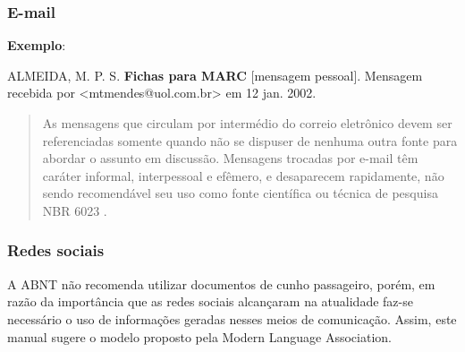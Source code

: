 \subsubsection{E-mail}

\begin{flushleft}
\begin{singlespace}
\end{singlespace}
\end{flushleft}

\begin{exemplomanual}
\textbf{Exemplo}:\\
\begin{singlespace}
ALMEIDA, M. P. S. \textbf{Fichas para MARC} [mensagem pessoal]. Mensagem recebida por <mtmendes@uol.com.br> em 12 jan. 2002.
\end{singlespace}
\end{exemplomanual}

\begin{quote}
As mensagens que circulam por intermédio do correio eletrônico devem ser referenciadas somente quando não se dispuser de nenhuma outra fonte para abordar o assunto em discussão. Mensagens trocadas por e-mail têm caráter informal, interpessoal e efêmero, e desaparecem rapidamente, não sendo recomendável seu uso como fonte científica ou técnica de pesquisa NBR 6023 \cite{NBR6023:2002}.
\end{quote}


\subsubsection{Redes sociais}

A ABNT não recomenda utilizar documentos de cunho passageiro, porém, em razão da importância que as redes sociais alcançaram na atualidade faz-se necessário o uso de informações geradas nesses meios de comunicação. Assim, este manual sugere o modelo proposto pela Modern Language Association.

\begin{flushleft}
\begin{singlespace}
\end{singlespace}
\end{flushleft}

